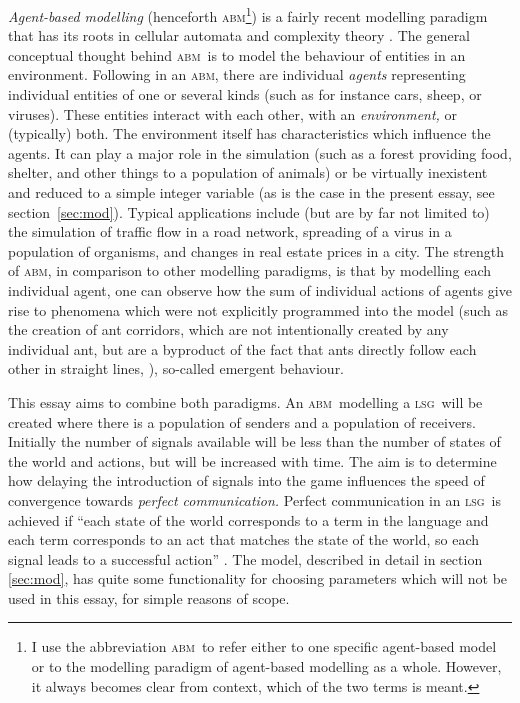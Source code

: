 \documentclass[
	DIV=calc,
	BCOR=0mm,
	pagesize,
	titlepage
]{scrartcl}
\newcommand{\abm}{\textsc{abm}}
\newcommand{\lsg}{\textsc{lsg}}
\begin{document}
\emph{Agent-based modelling} (henceforth \abm\footnote{I use the abbreviation \abm\ to refer either to one specific agent-based model or to the modelling paradigm of agent-based modelling as a whole. However, it always becomes clear from context, which of the two terms is meant.}) is a fairly recent modelling paradigm that has its roots in cellular automata and complexity theory \citep{heath_some_2014}.
The general conceptual thought behind \abm\ is to model the behaviour of entities in an environment.
Following \citet{grimm_individual_2005,railsback_agent_2011} in an \abm, there are individual \emph{agents} representing individual entities of one or several kinds (such as for instance cars, sheep, or viruses).
These entities interact with each other, with an \emph{environment,} or (typically) both.
The environment itself has characteristics which influence the agents.
It can play a major role in the simulation (such as a forest providing food, shelter, and other things to a population of animals) or be virtually inexistent and reduced to a simple integer variable (as is the case in the present essay, see section~\ref{sec:mod}).
Typical applications include (but are by far not limited to) the simulation of traffic flow in a road network, spreading of a virus in a population of organisms, and changes in real estate prices in a city.
The strength of \abm, in comparison to other modelling paradigms, is that  by modelling each individual agent, one can observe how the sum of individual actions of agents give rise to phenomena which were not explicitly programmed into the model (such as the creation of ant corridors, which are not intentionally created by any individual ant, but are a byproduct of the fact that ants directly follow each other in straight lines, \citet{wilensky_netlogo_1997}), so-called emergent behaviour.

This essay aims to combine both paradigms.
An \abm\ modelling a \lsg\ will be created where there is a population of senders and a population of receivers.
Initially the number of signals available will be less than the number of states of the world and actions, but will be increased with time.
The aim is to determine how delaying the introduction of signals into the game influences the speed of convergence towards \emph{perfect communication.}
Perfect communication in an \lsg\ is achieved if ``each state of the world corresponds to a term in the language and each term corresponds to an act that matches the state of the world, so each signal leads to a successful action'' \citep[p.~530, there referred to as ``perfect Lewis signalling system'']{barrett_dynamic_2007}.
The model, described in detail in section \ref{sec:mod}, has quite some functionality for choosing parameters which will not be used in this essay, for simple reasons of scope.
\end{document}
